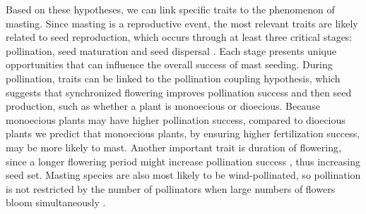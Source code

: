 \documentclass[11pt,letter]{article}
\begin{document}
Based on these hypotheses, we can link specific traits to the phenomenon of masting. Since masting is a reproductive event, the most relevant traits are likely related to seed reproduction, which occurs through at least three critical stages: pollination, seed maturation and seed dispersal \citep{satake2021studying}. Each stage presents unique opportunities that can influence the overall success of mast seeding. During pollination, traits can be linked to the pollination coupling hypothesis, which suggests that synchronized flowering improves pollination success and then seed production, such as whether a plant is monoecious or dioecious. Because monoecious plants may have higher pollination success, compared to dioecious plants  \citep[where separate genders for each individual plant may reduce pollination success in low-density populations,][]{bawa1980evolution} we predict that monoecious plants, by ensuring higher fertilization success, may be more likely to mast. Another important trait is duration of flowering, since a longer flowering period might increase pollination success \citep{knight2005pollen}, thus increasing seed set. Masting species are also most likely to be wind-pollinated, so pollination is not restricted by the number of pollinators when large numbers of flowers bloom simultaneously \citep{bogdziewicz2017masting, bogdziewicz2020flowering}.\par
\end{document}
